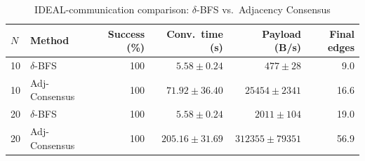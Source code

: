 \begin{table}[htbp]
  \centering
  \caption{IDEAL-communication comparison: $\delta$-BFS vs.\ Adjacency Consensus}
  \label{tab:ideal-comparison}
  \begin{tabular}{ll rrrr}
    \toprule
    $N$ & Method & Success (\%) & Conv.\ time (s) & Payload (B/s) & Final edges \\
    \midrule
    10 & $\delta$-BFS & 100 & $5.58 \pm 0.24$ & $477 \pm 28$ & 9.0 \\
    10 & Adj-Consensus & 100 & $71.92 \pm 36.40$ & $25454 \pm 2341$ & 16.6 \\
    \midrule
    20 & $\delta$-BFS & 100 & $5.58 \pm 0.24$ & $2011 \pm 104$ & 19.0 \\
    20 & Adj-Consensus & 100 & $205.16 \pm 31.69$ & $312355 \pm 79351$ & 56.9 \\
    \bottomrule
  \end{tabular}
\end{table}